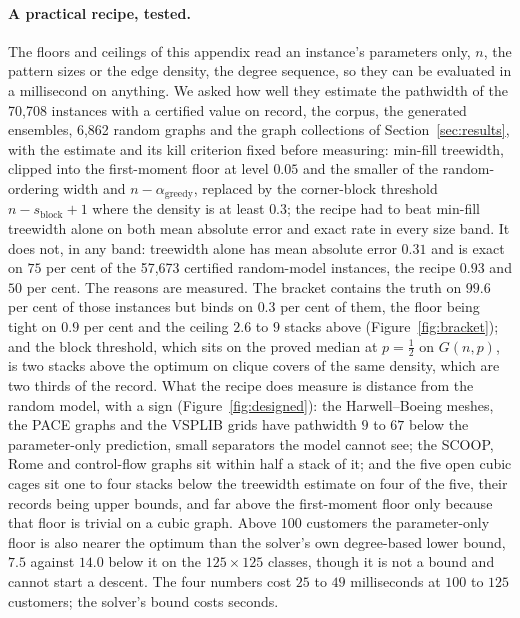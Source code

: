 \paragraph{A practical recipe, tested.}
The floors and ceilings of this appendix read an instance's parameters only,
$n$, the pattern sizes or the edge density, the degree sequence, so they can
be evaluated in a millisecond on anything. We asked how well they estimate
the pathwidth of the 70,708 instances with a certified value on record, the
corpus, the generated ensembles, 6,862 random graphs and the graph
collections of Section~\ref{sec:results}, with the estimate and its kill
criterion fixed before measuring: min-fill treewidth, clipped into the
first-moment floor at level $0.05$ and the smaller of the random-ordering
width and $n-\alpha_{\mathrm{greedy}}$, replaced by the corner-block
threshold $n-s_{\mathrm{block}}+1$ where the density is at least $0.3$; the
recipe had to beat min-fill treewidth alone on both mean absolute error and
exact rate in every size band. It does not, in any band: treewidth alone has
mean absolute error $0.31$ and is exact on $75$ per cent of the 57,673
certified random-model instances, the recipe $0.93$ and $50$ per cent. The
reasons are measured. The bracket contains the truth on $99.6$ per cent of
those instances but binds on $0.3$ per cent of them, the floor being tight on
$0.9$ per cent and the ceiling $2.6$ to $9$ stacks above
(Figure~\ref{fig:bracket}); and the block threshold, which sits on the proved
median at $p=\tfrac12$ on $G(n,p)$, is two stacks above the optimum on clique
covers of the same density, which are two thirds of the record. What the
recipe does measure is distance from the random model, with a sign
(Figure~\ref{fig:designed}): the Harwell--Boeing meshes, the PACE graphs and
the VSPLIB grids have pathwidth $9$ to $67$ below the parameter-only
prediction, small separators the model cannot see; the SCOOP, Rome and
control-flow graphs sit within half a stack of it; and the five open cubic
cages sit one to four stacks below the treewidth estimate on four of the
five, their records being upper bounds, and far above the first-moment floor
only because that floor is trivial on a cubic graph. Above $100$ customers
the parameter-only floor is also nearer the optimum than the solver's own
degree-based lower bound, $7.5$ against $14.0$ below it on the
$125\times125$ classes, though it is not a bound and cannot start a descent.
The four numbers cost $25$ to $49$ milliseconds at $100$ to $125$ customers;
the solver's bound costs seconds.

